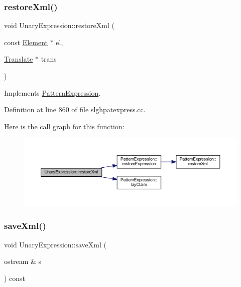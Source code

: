 \subsubsection{\texorpdfstring{restoreXml()}{restoreXml()}}
{\footnotesize\ttfamily void Unary\+Expression\+::restore\+Xml (\begin{DoxyParamCaption}\item[{const \mbox{\hyperlink{class_element}{Element}} $\ast$}]{el,  }\item[{\mbox{\hyperlink{class_translate}{Translate}} $\ast$}]{trans }\end{DoxyParamCaption})\hspace{0.3cm}{\ttfamily [virtual]}}



Implements \mbox{\hyperlink{class_pattern_expression_ad8986afdddbe7a8b64fdcf10478b5715}{Pattern\+Expression}}.



Definition at line 860 of file slghpatexpress.\+cc.

Here is the call graph for this function\+:
\nopagebreak
\begin{figure}[H]
\begin{center}
\leavevmode
\includegraphics[width=350pt]{class_unary_expression_ab9b25fcf136b758b13a4cbdcc401db69_cgraph}
\end{center}
\end{figure}
\mbox{\label{class_unary_expression_a8b6b833f511d84b606baf8233d271255}} 
\subsubsection{\texorpdfstring{saveXml()}{saveXml()}}
{\footnotesize\ttfamily void Unary\+Expression\+::save\+Xml (\begin{DoxyParamCaption}\item[{ostream \&}]{s }\end{DoxyParamCaption}) const\hspace{0.3cm}{\ttfamily [virtual]}}



